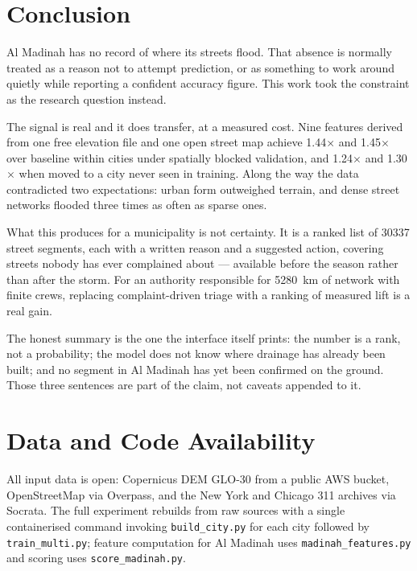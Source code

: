 \documentclass[11pt,a4paper]{article}
\newcommand{\ttt}[1]{\texttt{#1}}
\begin{document}
\section{Conclusion}\label{sec:conclusion}

Al Madinah has no record of where its streets flood. That absence is normally treated as a
reason not to attempt prediction, or as something to work around quietly while reporting a
confident accuracy figure. This work took the constraint as the research question instead.

The signal is real and it does transfer, at a measured cost. Nine features derived from one
free elevation file and one open street map achieve \num{1.44}$\times$ and
\num{1.45}$\times$ over baseline within cities under spatially blocked validation, and
\num{1.24}$\times$ and \num{1.30}$\times$ when moved to a city never seen in training.
Along the way the data contradicted two expectations: urban form outweighed terrain, and
dense street networks flooded three times as often as sparse ones.

What this produces for a municipality is not certainty. It is a ranked list of \num{30337}
street segments, each with a written reason and a suggested action, covering streets nobody
has ever complained about --- available before the season rather than after the storm. For
an authority responsible for \SI{5280}{\kilo\metre} of network with finite crews, replacing
complaint-driven triage with a ranking of measured lift is a real gain.

The honest summary is the one the interface itself prints: the number is a rank, not a
probability; the model does not know where drainage has already been built; and no segment
in Al Madinah has yet been confirmed on the ground. Those three sentences are part of the
claim, not caveats appended to it.

\section*{Data and Code Availability}
All input data is open: Copernicus DEM GLO-30 from a public AWS bucket, OpenStreetMap via
Overpass, and the New York and Chicago 311 archives via Socrata. The full experiment
rebuilds from raw sources with a single containerised command invoking
\ttt{build\_city.py} for each city followed by \ttt{train\_multi.py}; feature computation
for Al Madinah uses \ttt{madinah\_features.py} and scoring uses \ttt{score\_madinah.py}.



\end{document}
